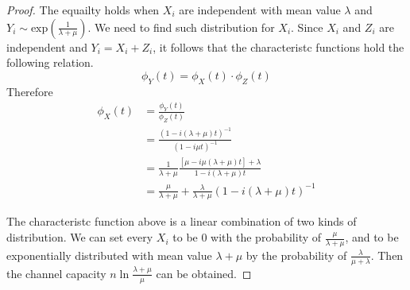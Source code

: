 \begin{exercise}
\begin{proof}
  The equailty holds when $X_i$ are independent with mean value $\lambda$ and $Y_i \sim \text{exp} \left(\frac{1}{\lambda+\mu}\right)$. We need to find such distribution for $X_i$. Since $X_i$ and $Z_i$ are independent and $Y_i = X_i + Z_i$, it follows that the characteristc functions hold the following relation.
  \begin{equation}
    \phi_Y (t) = \phi_X (t) \cdot \phi_Z(t)
  \end{equation}
  Therefore
  \begin{equation}
    \begin{aligned}
      \phi_X (t) &= \frac{\phi_Y(t)}{\phi_Z(t)} \\
      &= \frac{\left(1 - i(\lambda + \mu)t\right)^{-1}}{\left( 1 - i \mu t\right)^{-1}} \\
      &= \frac{1}{\lambda + \mu} \frac{\left[\mu - i \mu (\lambda + \mu)t\right] + \lambda}{1 - i(\lambda + \mu)t} \\
      &= \frac{\mu}{\lambda + \mu} + \frac{\lambda}{\lambda + \mu} \left(1 - i (\lambda + \mu)t\right)^{-1}
    \end{aligned}
  \end{equation}

  The characteristc function above is a linear combination of two kinds of distribution. We can set every $X_i$ to be 0 with the probability of $\frac{\mu}{\lambda + \mu}$, and to be exponentially distributed with mean value $\lambda + \mu$ by the probability of $\frac{\lambda}{\mu + \lambda}$. Then the channel capacity $ n \ln \frac{\lambda + \mu}{\mu} $ can be obtained.

  \end{proof}
  \label{ex4}
\end{exercise}